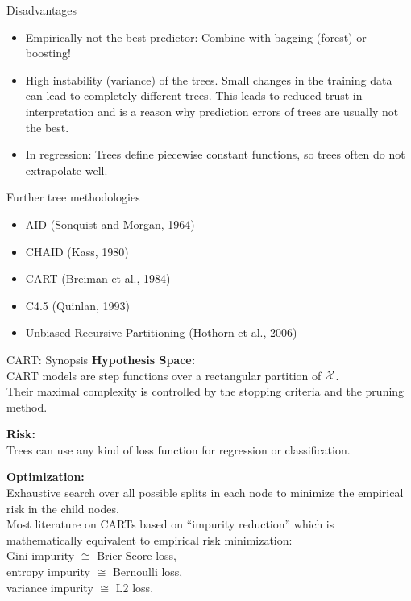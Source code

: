 \documentclass[11pt,compress,t,notes=noshow, xcolor=table]{beamer}
\begin{document}

\begin{vbframe}{Disadvantages}
\begin{itemize}
\item Empirically not the best predictor: Combine with bagging (forest) or boosting!
\item High instability (variance) of the trees.
  Small changes in the training data can lead to completely different trees. This leads to reduced trust in interpretation and is a reason why prediction errors of trees are usually not the best.
\item In regression: Trees define piecewise constant functions, so trees often do not extrapolate well.
\end{itemize}
\end{vbframe}

\begin{vbframe}{Further tree methodologies}

\begin{itemize}
\item AID (Sonquist and Morgan, 1964)
\item CHAID (Kass, 1980)
\item CART (Breiman et al., 1984)
\item C4.5 (Quinlan, 1993)
\item Unbiased Recursive Partitioning (Hothorn et al., 2006)
\end{itemize}

\end{vbframe}

\begin{vbframe}{CART: Synopsis}
\textbf{Hypothesis Space:}\\
CART models are step functions over a rectangular partition of $\mathcal{X}$.\\
Their maximal complexity is controlled by the stopping criteria and the pruning method.

\lz

\textbf{Risk:}\\
Trees can use any kind of loss function for regression or classification.

\lz

\textbf{Optimization:}\\
Exhaustive search over all possible splits in each node to minimize the empirical risk in the child nodes.\\

{\small
Most literature on CARTs based on \enquote{impurity reduction} which is mathematically equivalent to empirical risk minimization:\\
Gini impurity $\cong$ Brier Score loss,\\ entropy impurity $\cong$
Bernoulli loss,\\ variance impurity $\cong$ L2 loss.}

\end{vbframe}

\endlecture
\end{document}
